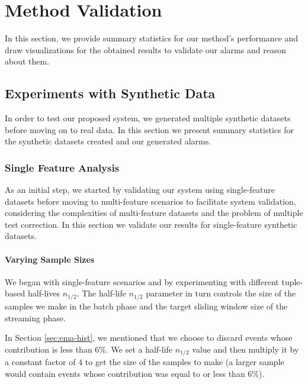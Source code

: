 \chapter{Method Validation} \label{chap:validation} \minitoc

In this section, we provide summary statistics for our method's performance and draw visualizations for the obtained results to validate our alarms and reason about them.

\section{Experiments with Synthetic Data}
In order to test our proposed system, we generated multiple synthetic datasets before moving on to real data. In this section we present summary statistics for the synthetic datasets created and our generated alarms.

\subsection{Single Feature Analysis}
As an initial step, we started by validating our system using single-feature datasets before moving to multi-feature scenarios to facilitate system validation, considering the complexities of multi-feature datasets and the problem of multiple test correction. In this section we validate our results for single-feature synthetic datasets.

\subsubsection{Varying Sample Sizes}
We began with single-feature scenarios and by experimenting with different tuple-based half-lives $n_{1/2}$. The half-life $n_{1/2}$ parameter in turn controls the size of the samples we make in the batch phase and the target sliding window size of the streaming phase. 

In Section \ref{sec:ema-hist}, we mentioned that we choose to discard events whose contribution is less than 6\%. We set a half-life $n_{1/2}$ value and then multiply it by a constant factor of 4 to get the size of the samples to make (a larger sample would contain events whose contribution was equal to or less than 6\%). 

